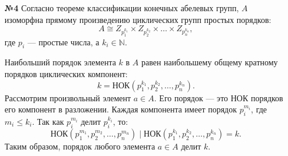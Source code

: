 \documentclass[a4paper]{article}
\renewcommand{\leq}{\leqslant}
\begin{document}
\begin{enumerate}
    \item[\textbf{№4}]Согласно теореме классификации конечных абелевых групп, \( A \) изоморфна прямому произведению циклических групп простых порядков:
    \[
    A \cong Z_{p_1^{k_1}} \times Z_{p_2^{k_2}} \times \ldots \times Z_{p_n^{k_n}},
    \]
    где \( p_i \) — простые числа, а \( k_i \in \mathbb{N} \). 

    Наибольший порядок элемента \( k \) в \( A \) равен наибольшему общему кратному порядков циклических компонент:
    \[
    k = \text{НОК}(p_1^{k_1}, p_2^{k_2}, \ldots, p_n^{k_n}).
    \]
    Рассмотрим произвольный элемент \( a \in A \). Его порядок — это НОК порядков его компонент в разложении. Каждая компонента имеет порядок \( p_i^{m_i} \), где \( m_i \leq k_i \). Так как \( p_i^{m_i} \) делит \( p_i^{k_i} \), то:
    \[
    \text{НОК}(p_1^{m_1}, p_2^{m_2}, \ldots, p_n^{m_n}) \mid \text{НОК}(p_1^{k_1}, p_2^{k_2}, \ldots, p_n^{k_n}) = k.
    \]
    Таким образом, порядок любого элемента \( a \in A \) делит \( k \).

                

\end{enumerate}
\end{document}
